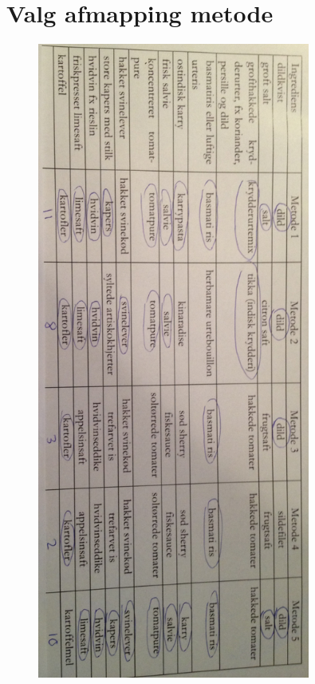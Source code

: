 \chapter{Valg afmapping metode}
\label{ap:valgafmappingmetode}

\begin{figure}
\centering
\includegraphics[width=0.8\textwidth]{billeder/valgafmappingmetode.png}
\end{figure}